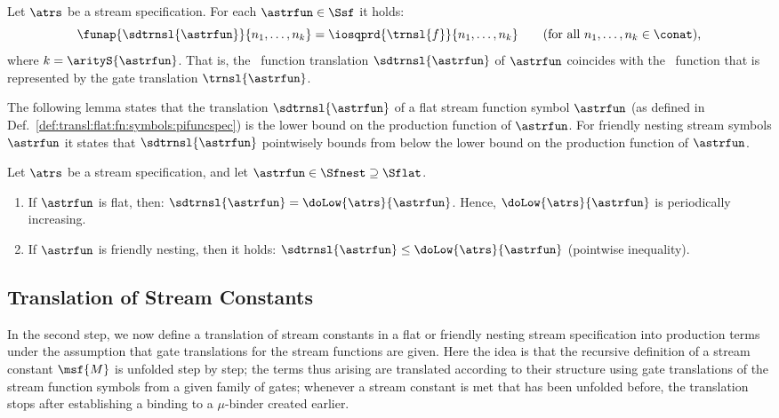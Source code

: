 \begin{proposition}\label{prop:corr:pein:gate:transl}
Let $\atrs$ be a stream specification.
  For each $\astrfun\in\Ssf$ it holds:
\begin{equation*}
\funap{\sdtrnsl{\astrfun}}{n_1,\ldots,n_k}
      = \iosqprd{\trnsl{f}}{n_1,\ldots,n_k}
    \qquad
    \text{(for all $n_1,\ldots,n_k\in\conat$),} 
\end{equation*}
where $k = \arityS{\astrfun}$.
  That is,
  the \pein~function translation $\sdtrnsl{\astrfun}$ of\/ $\astrfun$
  coincides with the \pein~function that is represented by the
  gate translation $\trnsl{\astrfun}$.
\end{proposition}


The following lemma states that the translation $\sdtrnsl{\astrfun}$
of a flat stream function symbol $\astrfun$ 
(as defined in Def.~\ref{def:transl:flat:fn:symbols:pifuncspec})
is the \daob{} lower bound on the production function of $\astrfun$.
For friendly nesting stream symbols $\astrfun$ it states
that $\sdtrnsl{\astrfun}$ pointwisely bounds from below
the \daob{} lower bound on the production function of $\astrfun$.


\begin{lemma}\label{lem:transl:soundness}
  Let $\atrs$ be a stream specification,
  and let\/ $\astrfun \in \Sfnest \supseteq \Sflat$.
\begin{enumerate}
    \item If\/ $\astrfun$ is flat, then:\/
      $\sdtrnsl{\astrfun} = \doLow{\atrs}{\astrfun}$.
      Hence, $\doLow{\atrs}{\astrfun}$ is periodically increasing.
    \item If\/ $\astrfun$ is friendly nesting, then it holds:\/
      $\sdtrnsl{\astrfun} \le \doLow{\atrs}{\astrfun}$
      (pointwise inequality).
  \end{enumerate}
\end{lemma}




\subsection{Translation of Stream Constants}
  \label{sec:translation:subsec:constants}



In the second step, we now define a translation of
stream constants
in a flat or friendly nesting stream specification into production terms
under the assumption that gate translations for the stream functions are given.
Here the idea is that the recursive definition of a stream constant
$\msf{M}$ is unfolded step by step;
the terms thus arising are translated according to their
structure using gate translations of the stream function symbols
from a given family of gates;
whenever a stream constant is met that has been unfolded before,
the translation stops after establishing a binding to a $\mu$-binder
created earlier.


